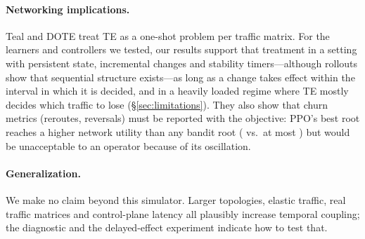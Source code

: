 \paragraph{Networking implications.} Teal and DOTE treat TE as a one-shot
problem per traffic matrix. For the learners and controllers we tested, our results
support that treatment in a setting with persistent state, incremental changes
and stability timers---although rollouts show that sequential structure
exists---as long as a change takes
effect within the interval in which it is decided, and in a heavily loaded
regime where TE mostly decides which traffic to lose (\S\ref{sec:limitations}). They also show that churn
metrics (reroutes, reversals) must be reported with the objective: PPO's best
root reaches a higher network utility than any bandit root (\PPOUtilMax{}
vs.\ at most \BanditUtilMax) but would be unacceptable to an operator because of its oscillation.

\paragraph{Generalization.} We make no claim beyond this simulator. Larger
topologies, elastic traffic, real traffic matrices and control-plane latency
all plausibly increase temporal coupling; the diagnostic and the
delayed-effect experiment indicate how to test that.
